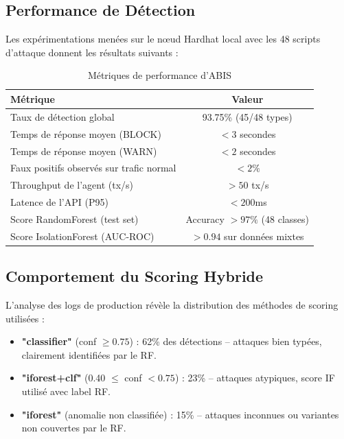 \documentclass[12pt,a4paper]{report}
\begin{document}
\subsection{Performance de Détection}

Les expérimentations menées sur le nœud Hardhat local avec les 48 scripts d'attaque donnent les résultats suivants :

\begin{table}[H]
\centering
\caption{Métriques de performance d'ABIS}
\label{tab:performance_metrics}
\begin{tabular}{lc}
\toprule
\textbf{Métrique} & \textbf{Valeur} \\
\midrule
Taux de détection global & 93.75\% (45/48 types) \\
Temps de réponse moyen (BLOCK) & $< 3$ secondes \\
Temps de réponse moyen (WARN) & $< 2$ secondes \\
Faux positifs observés sur trafic normal & $< 2\%$ \\
Throughput de l'agent (tx/s) & $> 50$ tx/s \\
Latence de l'API (P95) & $< 200$ms \\
Score RandomForest (test set) & Accuracy $> 97\%$ (48 classes) \\
Score IsolationForest (AUC-ROC) & $> 0.94$ sur données mixtes \\
\bottomrule
\end{tabular}
\end{table}

\subsection{Comportement du Scoring Hybride}

L'analyse des logs de production révèle la distribution des méthodes de scoring utilisées :

\begin{itemize}
  \item \textbf{"classifier"} (conf $\geq 0.75$) : 62\% des détections -- attaques bien typées, clairement identifiées par le RF.
  \item \textbf{"iforest+clf"} (0.40 $\leq$ conf $< 0.75$) : 23\% -- attaques atypiques, score IF utilisé avec label RF.
  \item \textbf{"iforest"} (anomalie non classifiée) : 15\% -- attaques inconnues ou variantes non couvertes par le RF.
\end{itemize}
\end{document}
